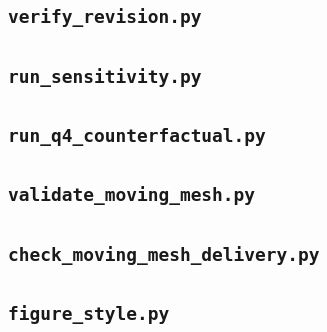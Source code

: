 
\label{app:source5end}

\subsection{\texorpdfstring{\texttt{verify\_revision.py}}{verify\_revision.py}}
\label{app:source6}


\label{app:source6end}

\subsection{\texorpdfstring{\texttt{run\_sensitivity.py}}{run\_sensitivity.py}}
\label{app:source7}


\label{app:source7end}

\subsection{\texorpdfstring{\texttt{run\_q4\_counterfactual.py}}{run\_q4\_counterfactual.py}}
\label{app:source8}


\label{app:source8end}

\subsection{\texorpdfstring{\texttt{validate\_moving\_mesh.py}}{validate\_moving\_mesh.py}}
\label{app:source9}


\label{app:source9end}

\subsection{\texorpdfstring{\texttt{check\_moving\_mesh\_delivery.py}}{check\_moving\_mesh\_delivery.py}}
\label{app:source10}


\label{app:source10end}

\subsection{\texorpdfstring{\texttt{figure\_style.py}}{figure\_style.py}}
\label{app:source11}

